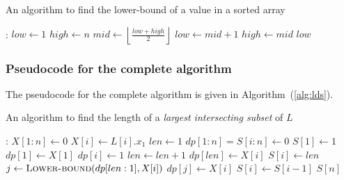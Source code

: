 \documentclass[12pt]{report}
\begin{document}
    \begin{algorithm}
        \caption{An algorithm to find the lower-bound of a value in a sorted array}
        \label{alg:lower-bound}
        \begin{algorithmic}[1]
            :
                \State $low \gets 1$
                \State $high \gets n$
                    \State $mid \gets \left\lfloor \frac{low + high}{2} \right\rfloor$
                        \State $low \gets mid + 1$
                    \Else
                        \State $high \gets mid$
                    \EndIf
                \EndWhile
                \State \Return $low$
            \EndProcedure
        \end{algorithmic}
    \end{algorithm}

    \subsubsection*{Pseudocode for the complete algorithm}
    The pseudocode for the complete algorithm is given in Algorithm~(\ref{alg:lds}).

    \begin{algorithm}
        \caption{An algorithm to find the length of a \textit{largest intersecting subset} of $L$}
        \label{alg:lds}
        \begin{algorithmic}[1]
            :
                \State {}
                \State $X[1:n] \gets 0$
                    \State $X[i] \gets L[i].x_{1}$
                \EndFor
                \State $len \gets 1$
                \State $dp[1:n] = S[i:n] \gets 0$
                \State $S[1] \gets 1$
                \State $dp[1] \gets X[1]$
                    \State $dp[i] \gets 1$
                        \State $len \gets len + 1$
                        \State $dp[len] \gets X[i]$
                        \State $S[i] \gets len$
                    \Else
                        \State $j \gets \Call{Lower-bound}{dp[len:1], X[i]}$
                        \State $dp[j] \gets X[i]$
                        \State $S[i] \gets S[i-1]$
                    \EndIf
                \EndFor
            \State \Return $S[n]$
            \EndProcedure
        \end{algorithmic}
    \end{algorithm}
\end{document}

